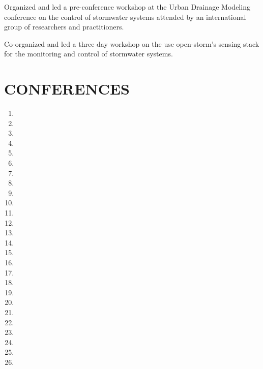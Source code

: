 \documentclass{my_cv}
\begin{document}
Organized and led a pre-conference workshop at the Urban Drainage Modeling conference on the control of stormwater systems attended by an international group of researchers and practitioners. 


Co-organized and led a three day workshop on the use open-storm's sensing stack for the monitoring and control of stormwater systems.

\section*{CONFERENCES}
\begin{enumerate}
	\item {}
	\item {}
	\item {}
	\item {}
	\item {}
	\item {}
	\item {}
	\item {}
	\item {}
	\item {}
	\item {}
	\item {}
	\item {}
	\item {}
	\item {}
	\item {}
	\item {}
	\item {}
	\item {}
	\item {}
	\item {}
	\item {}
	\item {}
	\item {}
	\item {}
	\item {}
\end{enumerate}
\end{document}
